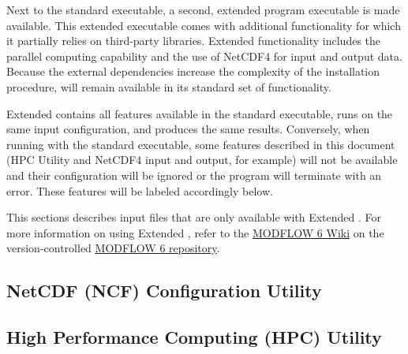 Next to the standard \mf executable, a second, extended program executable is made available. This extended executable comes with additional functionality for which it partially relies on third-party libraries. Extended functionality includes the parallel computing capability and the use of NetCDF4 for input and output data. Because the external dependencies increase the complexity of the installation procedure, \mf will remain available in its standard set of functionality.

Extended \mf contains all features available in the standard executable, runs on the same input configuration, and produces the same results. Conversely, when running with the standard executable, some features described in this document (HPC Utility and NetCDF4 input and output, for example) will not be available and their configuration will be ignored or the program will terminate with an error. These features will be labeled accordingly below.

This sections describes input files that are only available with Extended \mf.  For more information on using Extended \mf, refer to the \href{https://github.com/MODFLOW-ORG/modflow6/wiki}{MODFLOW 6 Wiki} on the version-controlled \href{https://github.com/MODFLOW-ORG/modflow6}{MODFLOW 6 repository}.

\newpage
\subsection{NetCDF (NCF) Configuration Utility}


\newpage
\subsection{High Performance Computing (HPC) Utility}


